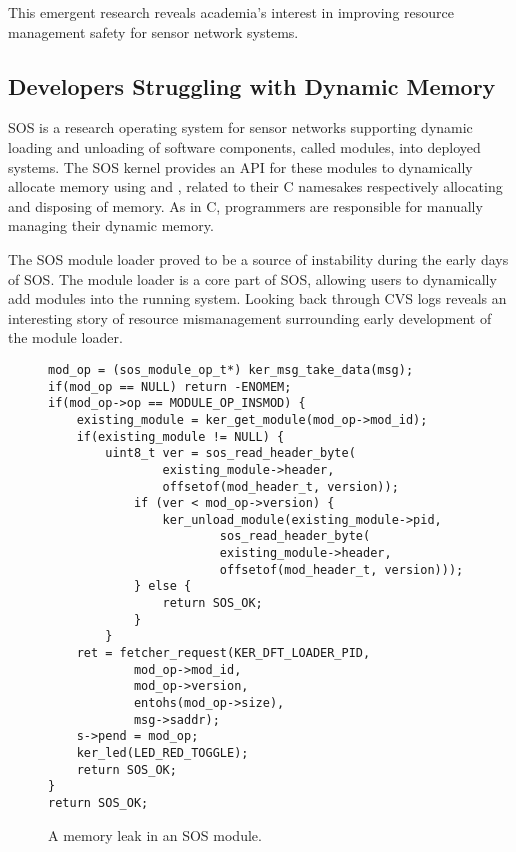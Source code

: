 This emergent research reveals academia's interest in improving resource
management safety for sensor network systems.



\subsection{Developers Struggling with Dynamic Memory}



SOS is a research operating system for sensor networks supporting dynamic
loading and unloading of software components, called modules, into deployed
systems.
%
The SOS kernel provides an API for these modules to dynamically allocate
memory using  and , related to their C
namesakes respectively allocating and disposing of memory.  
%
As in C, programmers are responsible for manually managing their dynamic
memory.  



The SOS module loader proved to be a source of instability during the early
days of SOS.
%
The module loader is a core part of SOS, allowing users to dynamically add
modules into the running system.
%
Looking back through CVS logs reveals an interesting story of resource
mismanagement surrounding early development of the module loader.



\begin{figure}[tp]
\begin{scriptsize}
\begin{verbatim}
mod_op = (sos_module_op_t*) ker_msg_take_data(msg);
if(mod_op == NULL) return -ENOMEM;
if(mod_op->op == MODULE_OP_INSMOD) {
    existing_module = ker_get_module(mod_op->mod_id);
    if(existing_module != NULL) {
        uint8_t ver = sos_read_header_byte(
                existing_module->header,
                offsetof(mod_header_t, version));
            if (ver < mod_op->version) {
                ker_unload_module(existing_module->pid, 
                        sos_read_header_byte(
                        existing_module->header,
                        offsetof(mod_header_t, version)));
            } else {
                return SOS_OK;
            }
        }
    ret = fetcher_request(KER_DFT_LOADER_PID,
            mod_op->mod_id,
            mod_op->version,
            entohs(mod_op->size),
            msg->saddr);
    s->pend = mod_op;
    ker_led(LED_RED_TOGGLE);
    return SOS_OK;
}
return SOS_OK;
\end{verbatim}
\end{scriptsize}
\caption{\label{fig:leak}A memory leak in an SOS module.}
\end{figure}



